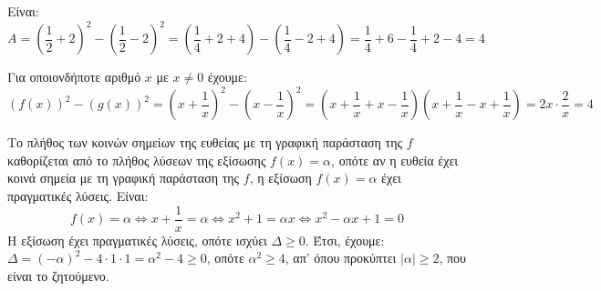 
\begin{alist}
\item Είναι:
\[A = \left(\dfrac{1}{2} + 2\right)^2 - \left(\dfrac{1}{2} - 2\right)^2 = \left(\dfrac{1}{4} + 2 + 4\right) - \left(\dfrac{1}{4} - 2 + 4\right) = \dfrac{1}{4} + 6 - \dfrac{1}{4} + 2 - 4 = 4\]

\item Για οποιονδήποτε αριθμό $x$ με $x \ne 0$ έχουμε:
\[(f(x))^2 - (g(x))^2 = \left(x + \dfrac{1}{x}\right)^2 - \left(x - \dfrac{1}{x}\right)^2 = \left(x + \dfrac{1}{x} + x - \dfrac{1}{x}\right)\left(x + \dfrac{1}{x} - x + \dfrac{1}{x}\right) = 2x \cdot \dfrac{2}{x} = 4\]

\item Το πλήθος των κοινών σημείων της ευθείας με τη γραφική παράσταση της $f$ καθορίζεται από το πλήθος λύσεων της εξίσωσης $f(x) = \alpha$, οπότε αν η ευθεία έχει κοινά σημεία με τη γραφική παράσταση της $f$, η εξίσωση $f(x) = \alpha$ έχει πραγματικές λύσεις. Είναι:
\[f(x) = \alpha \Leftrightarrow x + \dfrac{1}{x} = \alpha \Leftrightarrow x^2 + 1 = \alpha x \Leftrightarrow x^2 - \alpha x + 1 = 0\]
Η εξίσωση έχει πραγματικές λύσεις, οπότε ισχύει $\Delta \ge 0$. Έτσι, έχουμε:
$\Delta = (-\alpha)^2 - 4 \cdot 1 \cdot 1 = \alpha^2 - 4 \ge 0$, οπότε $\alpha^2 \ge 4$, απ’ όπου προκύπτει $|\alpha| \ge 2$, που είναι το ζητούμενο.
\end{alist}

